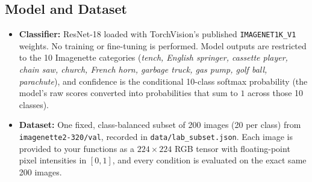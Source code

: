 \documentclass[11pt,letterpaper]{article}
\newcommand{\code}[1]{\texttt{\textcolor{primary}{#1}}}
\begin{document}
\subsection{Model and Dataset}
\begin{itemize}
  \item \textbf{Classifier:} ResNet-18 loaded with TorchVision's published \code{IMAGENET1K\_V1} weights. No training or fine-tuning is performed. Model outputs are restricted to the 10 Imagenette categories (\textit{tench, English springer, cassette player, chain saw, church, French horn, garbage truck, gas pump, golf ball, parachute}), and confidence is the conditional 10-class softmax probability (the model's raw scores converted into probabilities that sum to $1$ across those 10 classes).
  \item \textbf{Dataset:} One fixed, class-balanced subset of 200 images (20 per class) from \code{imagenette2-320/val}, recorded in \code{data/lab\_subset.json}. Each image is provided to your functions as a $224 \times 224$ RGB tensor with floating-point pixel intensities in $[0, 1]$, and every condition is evaluated on the exact same 200 images.
\end{itemize}

\clearpage
\end{document}
